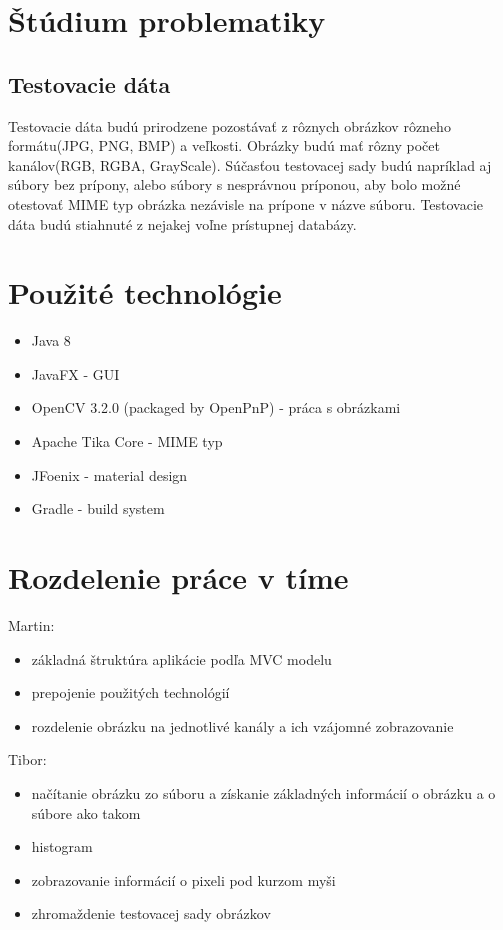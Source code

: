 \documentclass[12pt,a4paper,titlepage,final]{article}
\begin{document}
\section{Štúdium problematiky}
\ifdefined\whos

\fi

\subsection{Testovacie dáta}
Testovacie dáta budú prirodzene pozostávať z rôznych obrázkov rôzneho formátu(JPG, PNG, BMP) a veľkosti. Obrázky budú mať rôzny počet kanálov(RGB, RGBA, GrayScale). Súčasťou testovacej sady budú napríklad aj súbory bez prípony, alebo súbory s nesprávnou príponou, aby bolo možné otestovať MIME typ obrázka nezávisle na prípone v názve súboru.
Testovacie dáta budú stiahnuté z nejakej voľne prístupnej databázy.

\section{Použité technológie}
\begin{itemize}
	\item Java 8
	\item JavaFX - GUI
	\item OpenCV 3.2.0 (packaged by OpenPnP) - práca s obrázkami
	\item Apache Tika Core - MIME typ
	\item JFoenix - material design
	\item Gradle - build system
\end{itemize}

\section{Rozdelenie práce v tíme}
Martin:
\begin{itemize}
	\item základná štruktúra aplikácie podľa MVC modelu
	\item prepojenie použitých technológií
	\item rozdelenie obrázku na jednotlivé kanály a ich vzájomné zobrazovanie
\end{itemize}
Tibor:
\begin{itemize}
	\item načítanie obrázku zo súboru a získanie základných informácií o obrázku a o súbore ako takom
	\item histogram
	\item zobrazovanie informácií o pixeli pod kurzom myši
	\item zhromaždenie testovacej sady obrázkov
\end{itemize}
\end{document}
